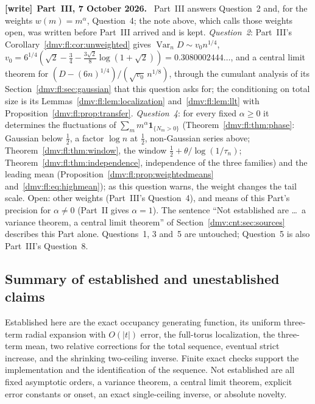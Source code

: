 \documentclass[11pt,letterpaper]{article}
\numberwithin{equation}{section}
\theoremstyle{definition}\newtheorem{definition}[theorem]{Definition}
\theoremstyle{remark}\newtheorem{remark}[theorem]{Remark}
\newenvironment{writenote}[1][]{\par\smallskip\begingroup\small
 \noindent\textbf{[write]}\if\relax\detokenize{#1}\relax\else~\textbf{#1.}\fi\ }%
 {\par\endgroup\smallskip}
\DeclareMathOperator{\Var}{Var}
\begin{document}
\begin{writenote}[Part~III, 7 October 2026]
Part~III answers Question~2 and, for the weights $w(m)=m^\alpha$, Question~4;
the note above, which calls those weights open, was written before
Part~III arrived and is kept. \emph{Question~2}: Part~III's
Corollary~\ref{dmv:fl:cor:unweighted} gives $\Var_nD\sim v_0n^{1/4}$,
$v_0=6^{1/4}(\sqrt2-\tfrac34-\tfrac{3\sqrt2}8\log(1+\sqrt2))=0.3080002444\ldots$,
and a central limit theorem for $(D-(6n)^{1/4})/(\sqrt{v_0}\,n^{1/8})$,
through the cumulant analysis of its Section~\ref{dmv:fl:sec:gaussian}
that this question asks for; the conditioning on total size is its
Lemmas~\ref{dmv:fl:lem:localization} and~\ref{dmv:fl:lem:llt} with
Proposition~\ref{dmv:fl:prop:transfer}. \emph{Question~4}: for every fixed
$\alpha\ge0$ it determines the fluctuations of
$\sum_mm^\alpha\mathbf 1_{\{N_m>0\}}$ (Theorem~\ref{dmv:fl:thm:phase}:
Gaussian below $\tfrac12$, a factor $\log n$ at $\tfrac12$, non-Gaussian
series above; Theorem~\ref{dmv:fl:thm:window}, the window
$\tfrac12+\theta/\log(1/\tau_n)$; Theorem~\ref{dmv:fl:thm:independence},
independence of the three families) and the leading mean
(Proposition~\ref{dmv:fl:prop:weightedmeans} and~\eqref{dmv:fl:eq:highmean});
as this question warns, the weight changes the tail scale. Open: other
weights (Part~III's Question~4), and means of this Part's precision for
$\alpha\ne0$ (Part~II gives $\alpha=1$). The sentence ``Not established
are \dots\ a variance theorem, a central limit theorem'' of
Section~\ref{dmv:cnt:sec:sources} describes this Part alone. Questions~1,
3 and~5 are untouched; Question~5 is also Part~III's Question~8.
\end{writenote}

\subsection{Summary of established and unestablished claims}
Established here are the exact occupancy generating function, its uniform three-term radial expansion with $O(|t|)$ error, the full-torus localization, the three-term mean, two relative corrections for the total sequence, eventual strict increase, and the shrinking two-ceiling inverse. Finite exact checks support the implementation and the identification of the sequence. Not established are all fixed asymptotic orders, a variance theorem, a central limit theorem, explicit error constants or onset, an exact single-ceiling inverse, or absolute novelty.
\end{document}

